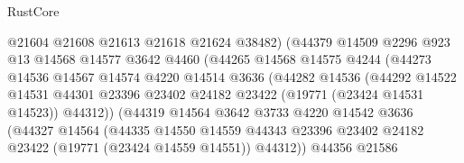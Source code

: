 \begin{lexlean}{RustCore}
\begin{coremodule}
                                @21604
                                @21608
                                @21613
                                @21618
                                @21624
                                @38482)
                              (@44379
                                @14509
                                @2296
                                @923
                                @13
                                @14568
                                @14577
                                @3642
                                @4460
                                (@44265
                                  @14568
                                  @14575
                                  @4244
                                  (@44273
                                    @14536
                                    @14567
                                    @14574
                                    @4220
                                    @14514
                                    @3636
                                    (@44282
                                      @14536
                                      (@44292
                                        @14522
                                        @14531
                                        @44301
                                        @23396
                                        @23402
                                        @24182
                                        @23422
                                        (@19771 (@23424 @14531 @14523))
                                        @44312))
                                    (@44319
                                      @14564
                                      @3642
                                      @3733
                                      @4220
                                      @14542
                                      @3636
                                      (@44327
                                        @14564
                                        (@44335
                                          @14550
                                          @14559
                                          @44343
                                          @23396
                                          @23402
                                          @24182
                                          @23422
                                          (@19771 (@23424 @14559 @14551))
                                          @44312))
                                      @44356
                                      @21586

\end{coremodule}
\end{lexlean}
